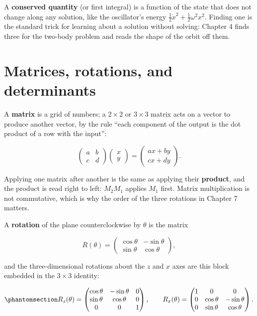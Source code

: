 \documentclass[
  10.5pt,
  letterpaper,
]{scrbook}
\theoremstyle{definition}
\theoremstyle{plain}
\theoremstyle{remark}
\begin{document}
A \textbf{conserved quantity} (or first integral) is a function of the
state that does not change along any solution, like the oscillator's
energy \(\tfrac12\dot x^2 + \tfrac12\omega^2 x^2\). Finding one is the
standard trick for learning about a solution without solving: Chapter 4
finds three for the two-body problem and reads the shape of the orbit
off them.

\section{Matrices, rotations, and
determinants}\label{matrices-rotations-and-determinants}

A \textbf{matrix} is a grid of numbers; a \(2\times2\) or \(3\times3\)
matrix acts on a vector to produce another vector, by the rule ``each
component of the output is the dot product of a row with the input'':

\[
\begin{pmatrix} a & b \\ c & d \end{pmatrix}\begin{pmatrix} x \\ y \end{pmatrix} = \begin{pmatrix} ax + by \\ cx + dy \end{pmatrix}.
\]

Applying one matrix after another is the same as applying their
\textbf{product}, and the product is read right to left: \(M_2 M_1\)
applies \(M_1\) first. Matrix multiplication is not commutative, which
is why the order of the three rotations in Chapter 7 matters.

A \textbf{rotation} of the plane counterclockwise by \(\theta\) is the
matrix

\[
R(\theta) = \begin{pmatrix} \cos\theta & -\sin\theta \\ \sin\theta & \cos\theta \end{pmatrix},
\]

and the three-dimensional rotations about the \(z\) and \(x\) axes are
this block embedded in the \(3\times3\) identity:

\begin{equation}\protect\phantomsection\label{eq-rotation-matrices}{
R_z(\theta) = \begin{pmatrix} \cos\theta & -\sin\theta & 0 \\ \sin\theta & \cos\theta & 0 \\ 0 & 0 & 1 \end{pmatrix}, \qquad
R_x(\theta) = \begin{pmatrix} 1 & 0 & 0 \\ 0 & \cos\theta & -\sin\theta \\ 0 & \sin\theta & \cos\theta \end{pmatrix}.
}\end{equation}
\end{document}
